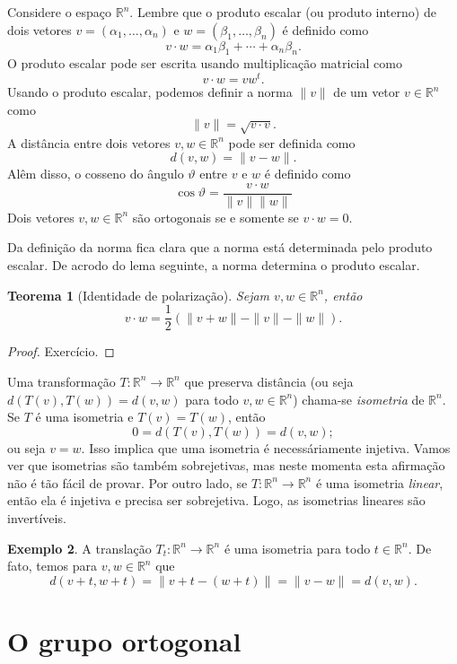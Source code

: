 \documentclass[12pt]{amsart}
\newcommand{\R}{\mathbb R}
\newtheorem{theorem}{Teorema}
\theoremstyle{definition}
\newtheorem{example}[theorem]{Exemplo}
\begin{document}
Considere o espaço $\R^n$. Lembre que o produto escalar (ou produto interno) de dois vetores 
$v=(\alpha_1,\ldots,\alpha_n)$ e $w=(\beta_1,\ldots,\beta_n)$ é definido como 
\[
    v\cdot w=\alpha_1\beta_1+\cdots+\alpha_n\beta_n.
\]
O produto escalar pode ser escrita usando multiplicação matricial como 
\[
    v\cdot w=vw^t.
\]
Usando o produto escalar, podemos definir a norma $\|v\|$ de um vetor $v\in\R^n$ como
\[
    \|v\|=\sqrt{v\cdot v}.
\] 
A distância entre dois vetores $v,w\in \R^n$ pode ser definida como 
\[
    d(v,w)=\|v-w\|.
\]
Alêm disso, o cosseno do ângulo $\vartheta$ entre $v$ e $w$ é definido como 
\[
    \cos\vartheta=\frac{v\cdot w}{\|v\|\|w\|}
\]
Dois vetores $v,w\in \R^n$ são ortogonais se e somente se $v\cdot w=0$.

Da definição da norma fica clara que a norma está determinada pelo produto escalar. De acrodo do lema seguinte, 
a norma determina o produto escalar.

\begin{theorem}[Identidade de polarização]   Sejam $v,w\in \R^n$, então 
    \[
        v\cdot w=\frac 12\left(\|v+w\|-\|v\|-\|w\|\right).
\]
\end{theorem}
\begin{proof}
    Exercício.
\end{proof}

Uma transformação $T:\R^n\to\R^n$ que preserva distância (ou seja $d(T(v),T(w))=d(v,w)$ para 
todo $v,w\in \R^n$) chama-se \emph{isometria} de $\R^n$. Se $T$ é uma isometria e $T(v)=T(w)$, então 
\[
    0=d(T(v),T(w))=d(v,w);
\]
ou seja $v=w$. Isso implica que uma isometria é necessáriamente injetiva. Vamos ver que isometrias são 
também sobrejetivas, mas neste momenta esta afirmação não é tão fácil de provar. Por outro lado, se 
$T:\R^n\to\R^n$ é  uma isometria \emph{linear}, então ela é injetiva e precisa ser sobrejetiva. Logo, as 
isometrias lineares são invertíveis.

\begin{example}
    A translação $T_t:\R^n\to \R^n$ é uma isometria para todo $t\in\R^n$. De fato, temos 
    para $v,w\in\R^n$ que 
    \[
        d(v+t,w+t)=\|v+t-(w+t)\|=\|v-w\|=d(v,w).
    \]
\end{example}

\section{O grupo ortogonal}
\end{document}
